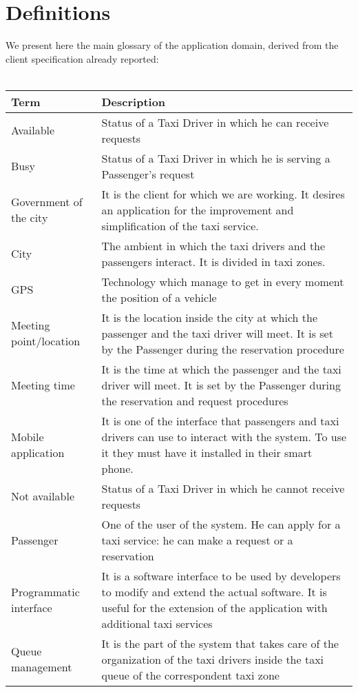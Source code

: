 \section{Definitions}
We present here the main glossary of the application domain, derived from the client specification already reported: \\ \\
\begin{center}
\begin{longtable}{| p{} | p{} |} \hline
{\Large \textbf{Term}} & {\Large \textbf{Description}} \\ \hline
Available & Status of a Taxi Driver in which he can receive requests \\ \hline
Busy & Status of a Taxi Driver in which he is serving a Passenger's request \\ \hline
Government of the city & It is the client for which we are working.  It desires an application for the improvement and simplification of the taxi service. \\ \hline
City & The ambient in which the taxi drivers and the passengers interact. It is divided in taxi zones. \\ \hline
GPS & Technology which manage to get in every moment the position of a vehicle \\ \hline
Meeting point/location & It is the location inside the city at which the passenger and the taxi driver will meet. It is set by the Passenger during the reservation procedure \\ \hline
Meeting time & It is the time at which the passenger and the taxi driver will meet. It is set by the Passenger during the reservation and request procedures\\ \hline
Mobile application & It is one of the interface that passengers and taxi drivers can use to interact with the system. To use it they must have it installed in their smart phone. \\ \hline
Not available & Status of a Taxi Driver in which he cannot receive requests \\ \hline
Passenger & One of the user of the system. He can apply for a taxi service: he can make a request or a reservation\\ \hline
Programmatic interface & It is a software interface to be used by developers to modify and extend the actual software. It is useful for the extension of the application with additional taxi services \\ \hline
Queue management & It is the part of the system that takes care of the organization of the taxi drivers inside the taxi queue of the correspondent taxi zone \\ \hline

\end{longtable}
\end{center}
